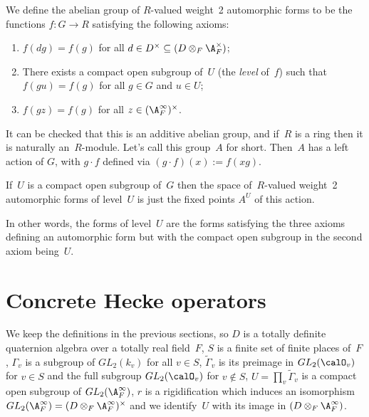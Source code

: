 \begin{definition}
  \label{TotallyDefiniteQuaternionAlgebra.WeightTwoAutomorphicForm}
  \leanok
  We define the abelian group of $R$-valued weight~2 automorphic forms
to be the functions $f:G\to R$ satisfying the following axioms:
\begin{enumerate}
  \item $f(dg)=f(g)$ for all $d\in D^\times\subseteq(D\otimes_F\A_F^\times)$;
  \item There exists a compact open subgroup of~$U$ (the \emph{level} of~$f$)
    such that $f(gu)=f(g)$ for all $g\in G$ and $u\in U$;
  \item $f(gz)=f(g)$ for all $z\in(\A_F^\infty)^\times$.
\end{enumerate}
\end{definition}

It can be checked that this is an additive abelian group, and if~$R$ is a ring
then it is naturally an~$R$-module. Let's call this group~$A$ for short.
Then~$A$ has a left action of $G$, with $g\cdot f$
defined via $(g\cdot f)(x):=f(xg)$.

\begin{definition}
  \label{TotallyDefiniteQuaternionAlgebra.WeightTwoAutomorphicFormOfLevel}
  \leanok
  If~$U$ is a compact open subgroup of~$G$ then the space of~$R$-valued weight~2
  automorphic forms of level~$U$ is just the fixed points $A^U$ of this action.
\end{definition}

In other words, the forms of level~$U$ are the forms satisfying the three axioms
defining an automorphic form but with the compact open subgroup in the second
axiom being~$U$.

\section{Concrete Hecke operators}

We keep the definitions in the previous sections, so $D$ is a totally definite
quaternion algebra over a totally real field~$F$, $S$ is a finite set of finite
places of~$F$, $\Gamma_v$ is a subgroup of $GL_2(k_v)$ for all $v\in S$,
$\tilde{\Gamma}_v$ is its preimage in $GL_2(\calO_v)$ for $v\in S$ and
the full subgroup $GL_2(\calO_v)$ for $v\notin S$, $U=\prod_v\tilde{\Gamma}_v$
is a compact open subgroup of $GL_2(\A_F^\infty)$, $r$ is a rigidification
which induces an isomorphism $GL_2(\A_F^\infty)=(D\otimes_F\A_F^\infty)^\times$
and we identify~$U$ with its image in $(D\otimes_F\A_F^\infty)$.

